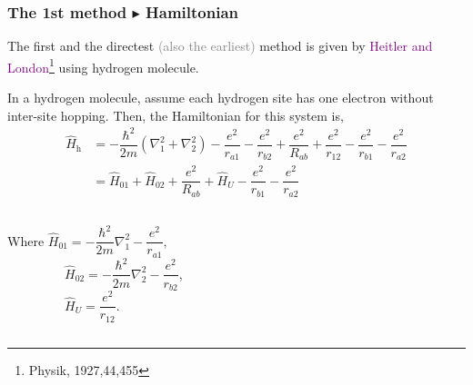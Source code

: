 \documentclass{beamer}
\begin{document}
  \begin{frame}
    \frametitle{The 1st method \(\blacktriangleright\) Hamiltonian}
    The first and the directest \textcolor{gray}{(also the earliest)} method is given by \textcolor{purple}{Heitler and London}\footnote{Physik, 1927,44,455} using hydrogen molecule. 

    In a hydrogen molecule, assume each hydrogen site has one electron without inter-site hopping. Then, the Hamiltonian for this system is,
    \begin{equation}
      \begin{aligned}
        \widehat{H}_{\text{h}} &= -\dfrac{\hbar^2}{2m}\left(\nabla_1^2 + \nabla_2^2\right) - \dfrac{e^2}{r_{a1}} - \dfrac{e^2}{r_{b2}} + \dfrac{e^2}{R_{ab}} + \dfrac{e^2}{r_{12}} - \dfrac{e^2}{r_{b1}} - \dfrac{e^2}{r_{a2}}\\
        &= \widehat{H}_{01} + \widehat{H}_{02} + \dfrac{e^2}{R_{ab}} + \widehat{H}_U - \dfrac{e^2}{r_{b1}} - \dfrac{e^2}{r_{a2}}
      \end{aligned}
    \end{equation}
    \begin{columns}
      \begin{column}{0.6\textwidth}
        Where {\small \(\widehat{H}_{01} = -\dfrac{\hbar^2}{2m}\nabla_1^2 - \dfrac{e^2}{r_{a1}}\), \\
    \ \ \ \ \ \ \ \ \ \(\widehat{H}_{02} = -\dfrac{\hbar^2}{2m}\nabla_2^2 - \dfrac{e^2}{r_{b2}}\), \\
    \ \ \ \ \ \ \ \ \ \(\widehat{H}_U = \dfrac{e^2}{r_{12}}\)}.
      \end{column}
      \begin{column}{0.35\textwidth}
      \end{column}
    \end{columns}
  \end{frame}
\end{document}
